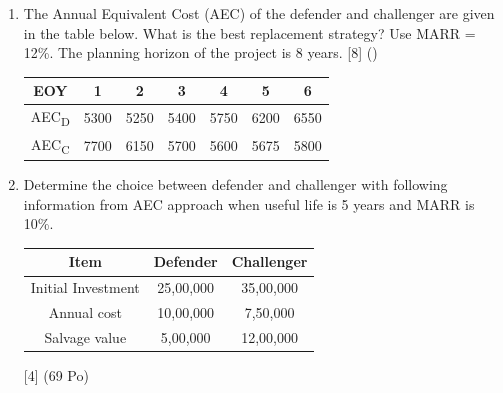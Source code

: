 \documentclass[12pt]{article}
\newcommand{\sub}[1]{\textsubscript{#1}}
\begin{document}
\begin{enumerate}
				\item The Annual Equivalent Cost (AEC) of the defender and challenger are given in the table below. What is the best replacement strategy? Use MARR = 12\%. The planning horizon of the project is 8 years. \hfill [8] ()\\
				\begin{tabular}{|c|c|c|c|c|c|c|}
					\hline
					EOY & 1 & 2 & 3 & 4 & 5 & 6 \\ \hline
					AEC\sub{D} & 5300 & 5250 & 5400 & 5750 & 6200 & 6550 \\ \hline
					AEC\sub{C} & 7700 & 6150 & 5700 & 5600 & 5675 & 5800 \\ \hline
				\end{tabular}

				\item Determine the choice between defender and challenger with following information from AEC approach when useful life is 5 years and MARR is 10\%. \\ 
				\begin{tabular}{|c|c|c|}
					\hline
					Item & Defender & Challenger \\ \hline
					Initial Investment & 25,00,000 & 35,00,000 \\ \hline
					Annual cost & 10,00,000 & 7,50,000 \\ \hline
					Salvage value & 5,00,000 & 12,00,000 \\ \hline
				\end{tabular} \hfill [4] (69 Po)
			\end{enumerate}
\end{document}
